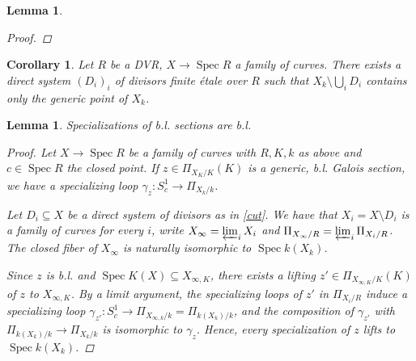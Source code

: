 \documentclass[11pt]{amsart}
\theoremstyle{plain}
\newtheorem{lemma}[theorem]{Lemma}
\newtheorem{corollary}[theorem]{Corollary}
\theoremstyle{definition}
\newcommand{\on}{\operatorname}
\newcommand{\1}{\mathbb{1}}
\newcommand{\s}{\subseteq}
\newcommand{\spec}{\on{Spec}}
\renewcommand{\P}{\mathbb{P}}
\renewcommand{\projlim}{\varprojlim}
\begin{document}
\begin{lemma}
\begin{proof}
		
		
		
		
		
	\end{proof}
\end{lemma}

\begin{corollary}\label{cut}
	Let $R$ be a DVR, $X\to \spec R$ a family of curves. There exists a direct system $(D_{i})_{i}$ of divisors finite étale over $R$ such that $X_{k}\setminus\bigcup_{i}D_{i}$ contains only the generic point of $X_{k}$.
\end{corollary}


\begin{lemma}\label{spebir}
	Specializations of b.l. sections are b.l.
	\begin{proof}
		Let $X\to \spec R$ be a family of curves with $R,K,k$ as above and $c\in\spec R$ the closed point. If $z\in\Pi_{X_{K}/K}(K)$ is a generic, b.l. Galois section, we have a specializing loop $\gamma_{z}:S^{1}_{c}\to\Pi_{X_{k}/k}$. 
		
		Let $D_{i}\s X$ be a direct system of divisors as in \autoref{cut}. We have that $X_{i}=X\setminus D_{i}$ is a family of curves for every $i$, write $X_{\infty}=\projlim_{i}X_{i}$ and $\Pi_{X_{\infty}/R}=\projlim_{i}\Pi_{X_{i}/R}$. The closed fiber of $X_{\infty}$ is naturally isomorphic to $\spec k(X_{k})$.
		
		Since $z$ is b.l. and $\spec K(X)\s X_{\infty,K}$, there exists a lifting $z'\in\Pi_{X_{\infty,K}/K}(K)$ of $z$ to $X_{\infty,K}$. By a limit argument, the specializing loops of $z'$ in $\Pi_{X_{i}/R}$ induce a specializing loop $\gamma_{z'}:S^{1}_{c}\to \Pi_{X_{\infty,k}/k}=\Pi_{k(X_{k})/k}$, and the composition of $\gamma_{z'}$ with $\Pi_{k(X_{k})/k}\to \Pi_{X_{k}/k}$ is isomorphic to $\gamma_{z}$. Hence, every specialization of $z$ lifts to $\spec k(X_{k})$.
	\end{proof}
\end{lemma}
\end{document}
